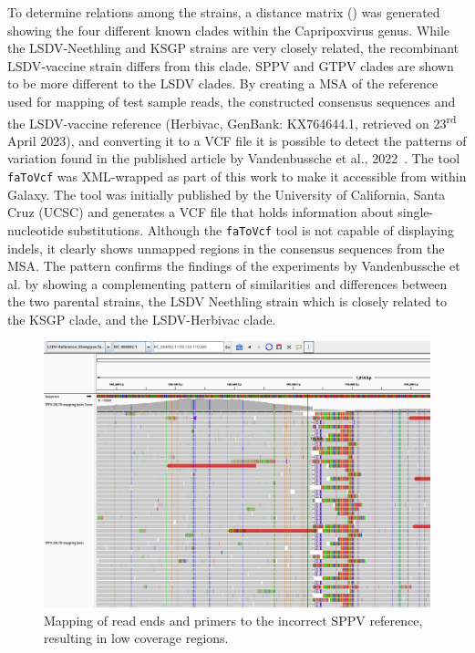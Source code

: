 To determine relations among the strains, a distance matrix () was generated showing the four different known clades within the Capripoxvirus genus. While the \ac{LSDV}-Neethling and KSGP strains are very closely related, the recombinant \ac{LSDV}-vaccine strain differs from this clade. \ac{SPPV} and \ac{GTPV} clades are shown to be more different to the \ac{LSDV} clades. By creating a \ac{MSA} of the reference used for mapping of test sample reads, the constructed consensus sequences and the \ac{LSDV}-vaccine reference (Herbivac, GenBank: KX764644.1, retrieved on 23\textsuperscript{rd} April 2023), and converting it to a \ac{VCF} file it is possible to detect the patterns of variation found in the published article by Vandenbussche et al., 2022~\cite{vandenbussche2022recombinant}. The tool \texttt{faToVcf} was XML-wrapped as part of this work to make it accessible from within Galaxy. The tool was initially published by the University of California, Santa Cruz (UCSC) and generates a \ac{VCF} file that holds information about single-nucleotide substitutions. Although the \texttt{faToVcf} tool is not capable of displaying indels, it clearly shows unmapped regions in the consensus sequences from the \ac{MSA}. The pattern confirms the findings of the experiments by Vandenbussche et al. by showing a complementing pattern of similarities and differences between the two parental strains, the \ac{LSDV} Neethling strain which is closely related to the KSGP clade, and the \ac{LSDV}-Herbivac clade.
\begin{figure}[ht!]
	\centering
	\includegraphics[width=1\textwidth]{media/4-capv-sppv-110.png}
	\caption[Mapping of read ends and primers to incorrect SPPV reference of LSDV reads.]{Mapping of read ends and primers to the incorrect SPPV reference, resulting in low coverage regions.}
	\label{fig:4-capv-sppv-110}
\end{figure}

